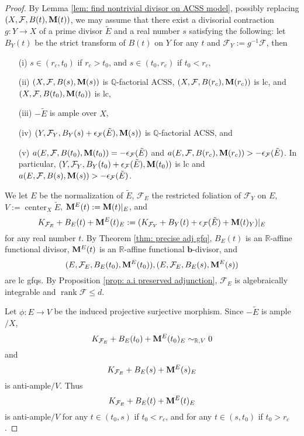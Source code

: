 \documentclass[11pt]{amsart}
\numberwithin{equation}{section}
\newcommand{\bb}{\bm{b}}
\newcommand{\Mm}{{\bf{M}}}
\newcommand{\Qq}{\mathbb{Q}}
\newcommand{\Rr}{\mathbb{R}}
\newcommand{\Center}{\operatorname{center}}
\newcommand{\rk}{\operatorname{rank}}
\newcommand{\Ff}{\mathcal{F}}
\theoremstyle{definition}
\theoremstyle{definition}
\theoremstyle{definition}
\begin{document}
\begin{proof}
By Lemma \ref{lem: find nontrivial divisor on ACSS model}, possibly replacing $(X,\Ff,B(t),\Mm(t))$, we may assume that there exist a divisorial contraction $g: Y\rightarrow X$ of a prime divisor $\tilde E$ and a real number $s$ satisfying the following: let $B_Y(t)$ be the strict transform of $B(t)$ on $Y$ for any $t$ and $\Ff_Y:=g^{-1}\Ff$, then
\begin{itemize}
\item[(i)] $s\in (r_c,t_0)$ if $r_c>t_0$, and $s\in (t_0,r_c)$ if $t_0<r_c$,
\item[(ii)] $(X,\Ff,B(s),\Mm(s))$ is $\Qq$-factorial ACSS, $(X,\Ff,B(r_c),\Mm(r_c))$ is lc, and  $(X,\Ff,B(t_0),\Mm(t_0))$ is lc,
\item[(iii)] $-\tilde E$ is ample over $X$,
\item[(iv)] $(Y,\Ff_Y,B_Y(s)+\epsilon_{\Ff}(\tilde E),\Mm(s))$ is $\Qq$-factorial ACSS, and
\item[(v)] $a(E,\Ff,B(t_0),\Mm(t_0))=-\epsilon_{\Ff}(\tilde E)$ and $a(E,\Ff,B(r_c),\Mm(r_c))>-\epsilon_{\Ff}(\tilde E)$. In particular, $(Y,\Ff_Y,B_Y(t_0)+\epsilon_{\Ff}(\tilde E),\Mm(t_0))$ is lc and $a(E,\Ff,B(s),\Mm(s))>-\epsilon_{\Ff}(\tilde E)$.
\end{itemize}
We let $E$ be the normalization of $\tilde E$, $\Ff_E$ the restricted foliation of $\Ff_Y$ on $E$, $V:=\Center_X\tilde E$,
$\Mm^E(t):=\Mm(t)|_E$, and
$$K_{\Ff_E}+B_E(t)+\Mm^E(t)_E:=(K_{\Ff_Y}+B_Y(t)+\epsilon_{\Ff}(\tilde E)+\Mm(t)_Y)|_E$$
for any real number $t$. By Theorem \ref{thm: precise adj gfq}, $B_E(t)$ is an $\Rr$-affine functional divisor, $\Mm^E(t)$ is an $\Rr$-affine functional $\bb$-divisor, and
$$(E,\Ff_E,B_E(t_0),\Mm^E(t_0)),(E,\Ff_E,B_E(s),\Mm^E(s))$$
are lc gfqs. By Proposition \ref{prop: a.i preserved adjunction}, $\Ff_E$ is algebraically integrable and $\rk\Ff\leq d$. 

Let $\phi: E\rightarrow V$ be the induced projective surjective morphism. Since $-\tilde E$ is ample$/X$,
$$K_{\Ff_E}+B_E(t_0)+\Mm^E(t_0)_E\sim_{\mathbb R,V}0$$
and
$$K_{\Ff_E}+B_E(s)+\Mm^E(s)_E$$
is anti-ample$/V$. Thus $$K_{\Ff_E}+B_E(t)+\Mm^E(t)_E$$ is anti-ample$/V$ for any $t\in (t_0,s)$ if $t_0<r_c$, and for any $t\in (s,t_0)$ if $t_0>r_c$.


\end{proof}
\end{document}
